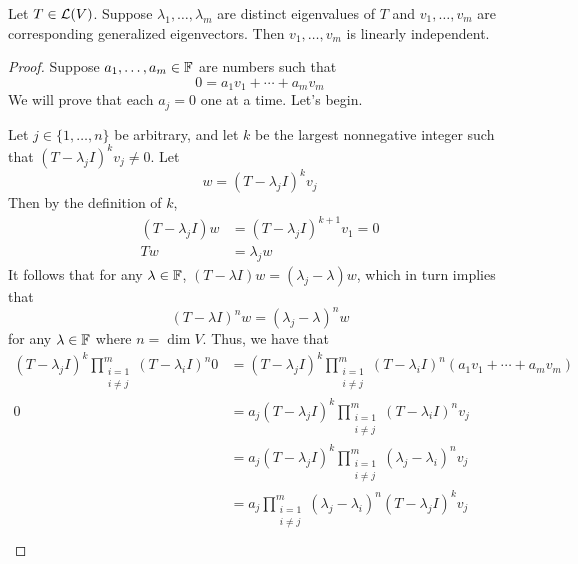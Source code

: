 \documentclass[../main.tex]{subfiles}
\begin{document}
\begin{itemize}
    \begin{theorem}
        Let $T\in\mathcal{L}(V)$. Suppose $\lambda_1,\dots,\lambda_m$ are distinct eigenvalues of $T$ and $v_1,\dots,v_m$ are corresponding generalized eigenvectors. Then $v_1,\dots,v_m$ is linearly independent.
        \begin{proof}
            Suppose $a_1,\dots,a_m\in\mathbb{F}$ are numbers such that
            \begin{equation*}
                0 = a_1v_1+\cdots+a_mv_m
            \end{equation*}
            We will prove that each $a_j=0$ one at a time. Let's begin.\par
            Let $j\in\{1,\dots,n\}$ be arbitrary, and let $k$ be the largest nonnegative integer such that $(T-\lambda_jI)^kv_j\neq 0$. Let
            \begin{equation*}
                w = (T-\lambda_jI)^kv_j
            \end{equation*}
            Then by the definition of $k$,
            \begin{align*}
                (T-\lambda_jI)w &= (T-\lambda_jI)^{k+1}v_1 = 0\\
                Tw &= \lambda_jw
            \end{align*}
            It follows that for any $\lambda\in\mathbb{F}$, $(T-\lambda I)w=(\lambda_j-\lambda)w$, which in turn implies that
            \begin{equation*}
                (T-\lambda I)^nw = (\lambda_j-\lambda)^nw
            \end{equation*}
            for any $\lambda\in\mathbb{F}$ where $n=\dim V$. Thus, we have that
            \begin{align*}
                (T-\lambda_jI)^k\prod_{\substack{i=1\\i\neq j}}^m(T-\lambda_iI)^n0 &= (T-\lambda_jI)^k\prod_{\substack{i=1\\i\neq j}}^m(T-\lambda_iI)^n(a_1v_1+\cdots+a_mv_m)\\
                0 &= a_j(T-\lambda_jI)^k\prod_{\substack{i=1\\i\neq j}}^m(T-\lambda_iI)^nv_j\\
                &= a_j(T-\lambda_jI)^k\prod_{\substack{i=1\\i\neq j}}^m(\lambda_j-\lambda_i)^nv_j\\
                &= a_j\prod_{\substack{i=1\\i\neq j}}^m(\lambda_j-\lambda_i)^n(T-\lambda_jI)^kv_j\\

\end{align*}
\end{proof}
\end{theorem}
\end{itemize}
\end{document}
